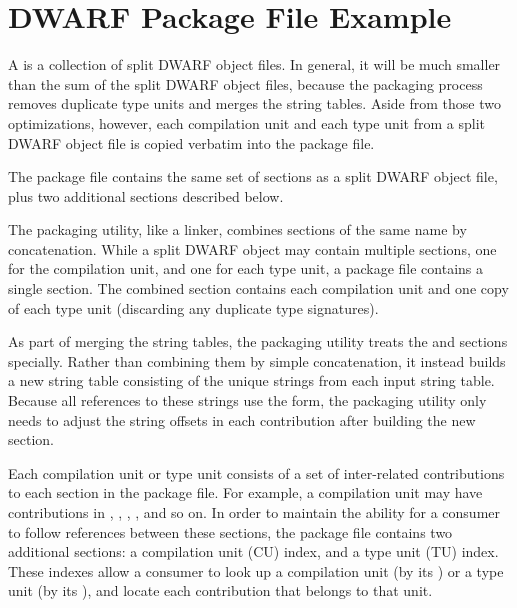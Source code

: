 \clearpage
\section{DWARF Package File Example}
\label{app:dwarfpackagefileexample}

A  is a collection of split 
DWARF object files.
In general, it will be much smaller than the sum of the split
DWARF object files, because the packaging process removes duplicate
type units and merges the string tables. Aside from those two
optimizations, however, each compilation unit and each type unit
from a split DWARF object file is copied verbatim into the package
file.

The package file contains the same set of sections as a split
DWARF object file, plus two additional sections described below.

The packaging utility, like a linker, combines sections of the
same name by concatenation. While a split DWARF object may
contain multiple \dotdebuginfodwo{} sections, one for the
compilation unit, and one for each type unit, a package file
contains a single \dotdebuginfodwo{} section. The combined
\dotdebuginfodwo{} section contains each compilation unit and one
copy of each type unit (discarding any duplicate type
signatures).

As part of merging the string tables, the packaging utility
treats the \dotdebugstrdwo{} and \dotdebugstroffsetsdwo{}
sections specially. Rather than
combining them by simple concatenation, it instead builds a new
string table consisting of the unique strings from each input
string table. Because all references to these strings use the
\DWFORMstrx{} form, the packaging utility only needs to adjust the
string offsets in each \dotdebugstroffsetsdwo{} contribution after
building the new \dotdebugstrdwo{} section.

Each compilation unit or type unit consists of a set of
inter-related contributions to each section in the package file.
For example, a compilation unit may have contributions in
\dotdebuginfodwo{}, \dotdebugabbrevdwo{}, \dotdebuglinedwo{},
\dotdebugstroffsetsdwo{}, and so on. In order to maintain the ability 
for a consumer to follow references between these sections, the
package file contains two additional sections: a compilation unit
(CU) index, and a type unit (TU) index. These indexes allow a
consumer to look up a compilation unit (by its \CUsignature) or 
a type unit (by its \TUsignature), and locate each contribution 
that belongs to that unit.

